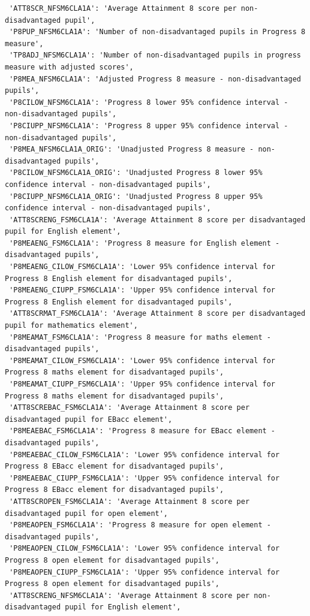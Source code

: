 \documentclass[
  letterpaper,
  DIV=11,
  numbers=noendperiod]{scrartcl}
\begin{document}
\begin{verbatim}
 'ATT8SCR_NFSM6CLA1A': 'Average Attainment 8 score per non-disadvantaged pupil',
 'P8PUP_NFSM6CLA1A': 'Number of non-disadvantaged pupils in Progress 8 measure',
 'TP8ADJ_NFSM6CLA1A': 'Number of non-disadvantaged pupils in progress measure with adjusted scores',
 'P8MEA_NFSM6CLA1A': 'Adjusted Progress 8 measure - non-disadvantaged pupils',
 'P8CILOW_NFSM6CLA1A': 'Progress 8 lower 95% confidence interval - non-disadvantaged pupils',
 'P8CIUPP_NFSM6CLA1A': 'Progress 8 upper 95% confidence interval - non-disadvantaged pupils',
 'P8MEA_NFSM6CLA1A_ORIG': 'Unadjusted Progress 8 measure - non-disadvantaged pupils',
 'P8CILOW_NFSM6CLA1A_ORIG': 'Unadjusted Progress 8 lower 95% confidence interval - non-disadvantaged pupils',
 'P8CIUPP_NFSM6CLA1A_ORIG': 'Unadjusted Progress 8 upper 95% confidence interval - non-disadvantaged pupils',
 'ATT8SCRENG_FSM6CLA1A': 'Average Attainment 8 score per disadvantaged pupil for English element',
 'P8MEAENG_FSM6CLA1A': 'Progress 8 measure for English element - disadvantaged pupils',
 'P8MEAENG_CILOW_FSM6CLA1A': 'Lower 95% confidence interval for Progress 8 English element for disadvantaged pupils',
 'P8MEAENG_CIUPP_FSM6CLA1A': 'Upper 95% confidence interval for Progress 8 English element for disadvantaged pupils',
 'ATT8SCRMAT_FSM6CLA1A': 'Average Attainment 8 score per disadvantaged pupil for mathematics element',
 'P8MEAMAT_FSM6CLA1A': 'Progress 8 measure for maths element - disadvantaged pupils',
 'P8MEAMAT_CILOW_FSM6CLA1A': 'Lower 95% confidence interval for Progress 8 maths element for disadvantaged pupils',
 'P8MEAMAT_CIUPP_FSM6CLA1A': 'Upper 95% confidence interval for Progress 8 maths element for disadvantaged pupils',
 'ATT8SCREBAC_FSM6CLA1A': 'Average Attainment 8 score per disadvantaged pupil for EBacc element',
 'P8MEAEBAC_FSM6CLA1A': 'Progress 8 measure for EBacc element - disadvantaged pupils',
 'P8MEAEBAC_CILOW_FSM6CLA1A': 'Lower 95% confidence interval for Progress 8 EBacc element for disadvantaged pupils',
 'P8MEAEBAC_CIUPP_FSM6CLA1A': 'Upper 95% confidence interval for Progress 8 EBacc element for disadvantaged pupils',
 'ATT8SCROPEN_FSM6CLA1A': 'Average Attainment 8 score per disadvantaged pupil for open element',
 'P8MEAOPEN_FSM6CLA1A': 'Progress 8 measure for open element - disadvantaged pupils',
 'P8MEAOPEN_CILOW_FSM6CLA1A': 'Lower 95% confidence interval for Progress 8 open element for disadvantaged pupils',
 'P8MEAOPEN_CIUPP_FSM6CLA1A': 'Upper 95% confidence interval for Progress 8 open element for disadvantaged pupils',
 'ATT8SCRENG_NFSM6CLA1A': 'Average Attainment 8 score per non-disadvantaged pupil for English element',

\end{verbatim}
\end{document}
